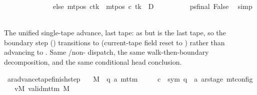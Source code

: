 \begin{isabellebody}
\ \ \ \ \ \ \ \ \ \ \ \ \ \ else\ {\isacharparenleft}{\kern0pt}mt{\isacharunderscore}{\kern0pt}pos\ c{}{\isacharparenright}{\kern0pt}{\isacharparenleft}{\kern0pt}tk\ {\isacharcolon}{\kern0pt}{\isacharequal}{\kern0pt}\ mt{\isacharunderscore}{\kern0pt}pos\ c{}\ tk\ {\isacharminus}{\kern0pt}\ {\isacharquery}{\kern0pt}D{\isacharparenright}{\kern0pt}{\isacharparenright}{\kern0pt}{\isachardoublequoteclose}\isanewline
\ \ \ \ \ \ \ \ \isamarkupfalse%
\ ps{\isacharunderscore}{\kern0pt}final\ False\ \isamarkupfalse%
\ simp\isanewline
\ \ \ \ \isamarkupfalse%
\isanewline
\ \ \isamarkupfalse%
\isanewline
{}\isamarkupfalse%
%
\endisatagproof
{\isafoldproof}%
%
\isadelimproof
%
\endisadelimproof
%
\begin{isamarkuptext}%
The unified single-tape advance, last tape: as
   but  is the last tape, so the
  boundary step () transitions to
   (current-tape field reset to )
  rather than advancing to .  Same /non-
  dispatch, the same walk-then-boundary decomposition, and the same
  conditional head conclusion.%
\end{isamarkuptext}\isamarkuptrue%
\isamarkupfalse%
\ ar{\isacharunderscore}{\kern0pt}advance{\isacharunderscore}{\kern0pt}tape{\isacharunderscore}{\kern0pt}finish{\isacharunderscore}{\kern0pt}step{\isacharcolon}{\kern0pt}\isanewline
\ \ \ M\ {\isacharcolon}{\kern0pt}{\isacharcolon}{\kern0pt}\ {\isachardoublequoteopen}{\isacharparenleft}{\kern0pt}{\isacharprime}{\kern0pt}q{\isacharcomma}{\kern0pt}\ {\isacharprime}{\kern0pt}a{\isacharparenright}{\kern0pt}\ mttm{\isachardoublequoteclose}\isanewline
\ \ \ \ \ c{}\ {\isacharcolon}{\kern0pt}{\isacharcolon}{\kern0pt}\ {\isachardoublequoteopen}{\isacharparenleft}{\kern0pt}sym{}{\isacharcomma}{\kern0pt}\ {\isacharprime}{\kern0pt}q\ {\isasymtimes}\ {\isacharprime}{\kern0pt}a\ ar{\isacharunderscore}{\kern0pt}stage{\isacharparenright}{\kern0pt}\ mt{\isacharunderscore}{\kern0pt}config{\isachardoublequoteclose}\isanewline
\ \ \ vM{\isacharcolon}{\kern0pt}\ {\isachardoublequoteopen}valid{\isacharunderscore}{\kern0pt}mttm\ M{\isachardoublequoteclose}\isanewline

\end{isabellebody}
